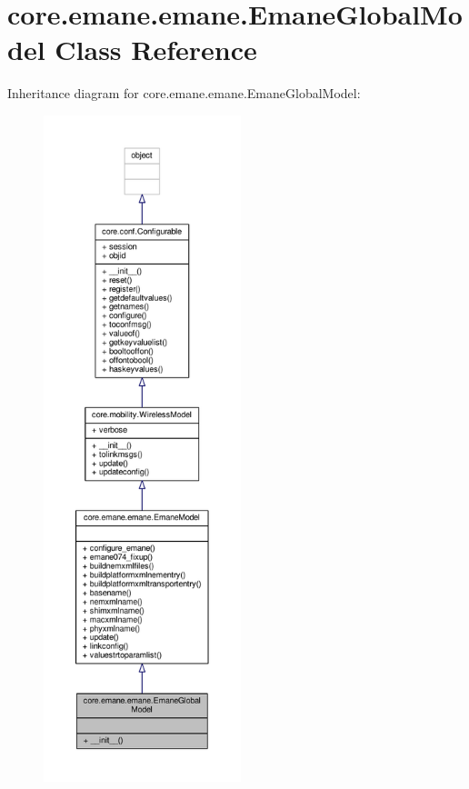 \hypertarget{classcore_1_1emane_1_1emane_1_1_emane_global_model}{\section{core.\+emane.\+emane.\+Emane\+Global\+Model Class Reference}
\label{classcore_1_1emane_1_1emane_1_1_emane_global_model}
}


Inheritance diagram for core.\+emane.\+emane.\+Emane\+Global\+Model\+:
\nopagebreak
\begin{figure}[H]
\begin{center}
\leavevmode
\includegraphics[height=550pt]{classcore_1_1emane_1_1emane_1_1_emane_global_model__inherit__graph}
\end{center}
\end{figure}


